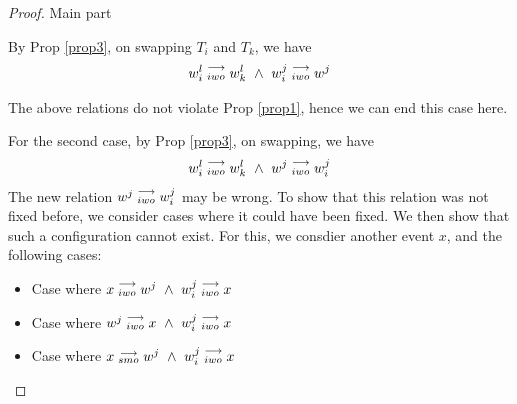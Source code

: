 \begin{proof}{Main part}
\begin{itemize}
                        By Prop \ref{prop3}, on swapping $T_i$ and $T_k$, we have 
                        \begin{align*}
                            \reln{w_i^l}{iwo}{w_k^l} \ \wedge \ \reln{w_i^j}{iwo}{w^j}
                        \end{align*}

                        The above relations do not violate Prop \ref{prop1}, hence we can end this case here. 

                        For the second case, by Prop \ref{prop3}, on swapping, we have 
                        \begin{align*}
                            \reln{w_i^l}{iwo}{w_k^l} \ \wedge \ \reln{w^j}{iwo}{w_i^j}
                        \end{align*}
                        The new relation $w^j\stackrel{\longrightarrow}{_{iwo}}w_i^j$ may be wrong. 
                        To show that this relation was not fixed before, we consider cases where it could have been fixed. We then show that such a configuration cannot exist. For this, we consdier another event $x$, and the following cases:

                        \begin{itemize}
                            \item Case where $x\stackrel{\longrightarrow}{_{iwo}}w^j \ \wedge \ w_i^j\stackrel{\longrightarrow}{_{iwo}}x$
                            \item Case where $w^j\stackrel{\longrightarrow}{_{iwo}}x \ \wedge \ w_i^j\stackrel{\longrightarrow}{_{iwo}}x$
                            \item Case where $x\stackrel{\longrightarrow}{_{smo}}w^j \ \wedge \ w_i^j\stackrel{\longrightarrow}{_{iwo}}x$
                                
                                

\end{itemize}
\end{itemize}
\end{proof}
